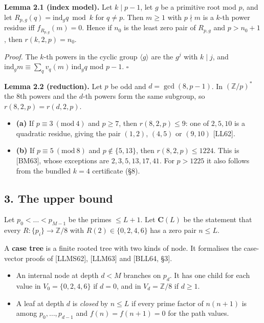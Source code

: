 \documentclass[
]{amsart}
\providecommand{\tightlist}{%
  \setlength{\itemsep}{0pt}\setlength{\parskip}{0pt}}
\begin{document}
\textbf{Lemma 2.1 (index model).} Let \(k\mid p-1\), let \(g\) be a
primitive root mod \(p\), and let \(R_{p,g}(q)=\mathrm{ind}_gq\bmod k\)
for \(q\ne p\). Then \(m\ge1\) with \(p\nmid m\) is a \(k\)-th power
residue iff \(f_{R_{p,g}}(m)=0\). Hence if \(n_0\) is the least zero
pair of \(R_{p,g}\) and \(p>n_0+1\), then \(r(k,2,p)=n_0\).

\emph{Proof.} The \(k\)-th powers in the cyclic group
\(\langle g\rangle\) are the \(g^j\) with \(k\mid j\), and
\(\mathrm{ind}_gm\equiv\sum_qv_q(m)\,\mathrm{ind}_gq\) mod \(p-1\).
\(\square\)

\textbf{Lemma 2.2 (reduction).} Let \(p\) be odd and \(d=\gcd(8,p-1)\).
In \((\mathbb{Z}/p)^*\) the 8th powers and the \(d\)-th powers form the
same subgroup, so \(r(8,2,p)=r(d,2,p)\).

\begin{itemize}
\tightlist
\item
  \textbf{(a)} If \(p\equiv3\ (\mathrm{mod}\ 4)\) and \(p\ge7\), then
  \(r(8,2,p)\le9\): one of \(2,5,10\) is a quadratic residue, giving the
  pair \((1,2)\), \((4,5)\) or \((9,10)\) {[}LL62{]}.
\item
  \textbf{(b)} If \(p\equiv5\ (\mathrm{mod}\ 8)\) and
  \(p\notin\{5,13\}\), then \(r(8,2,p)\le1224\). This is {[}BM63{]},
  whose exceptions are \(2,3,5,13,17,41\). For \(p>1225\) it also
  follows from the bundled \(k=4\) certificate (§8).
\end{itemize}

\hypertarget{the-upper-bound}{%
\subsection{3. The upper bound}\label{the-upper-bound}}

Let \(p_0<\dots<p_{M-1}\) be the primes \(\le L+1\). Let
\(\mathbf{C}(L)\) be the statement that every
\(R:\{p_i\}\to\mathbb{Z}/8\) with \(R(2)\in\{0,2,4,6\}\) has a zero pair
\(n\le L\).

A \textbf{case tree} is a finite rooted tree with two kinds of node. It
formalises the case-vector proofs of {[}LLMS62{]}, {[}LLM63{]} and
{[}BLL64, §3{]}.

\begin{itemize}
\tightlist
\item
  An internal node at depth \(d<M\) branches on \(p_d\). It has one
  child for each value in \(V_0=\{0,2,4,6\}\) if \(d=0\), and in
  \(V_d=\mathbb{Z}/8\) if \(d\ge1\).
\item
  A leaf at depth \(d\) is \emph{closed} by \(n\le L\) if every prime
  factor of \(n(n+1)\) is among \(p_0,\dots,p_{d-1}\) and
  \(f(n)=f(n+1)=0\) for the path values.
\end{itemize}
\end{document}
